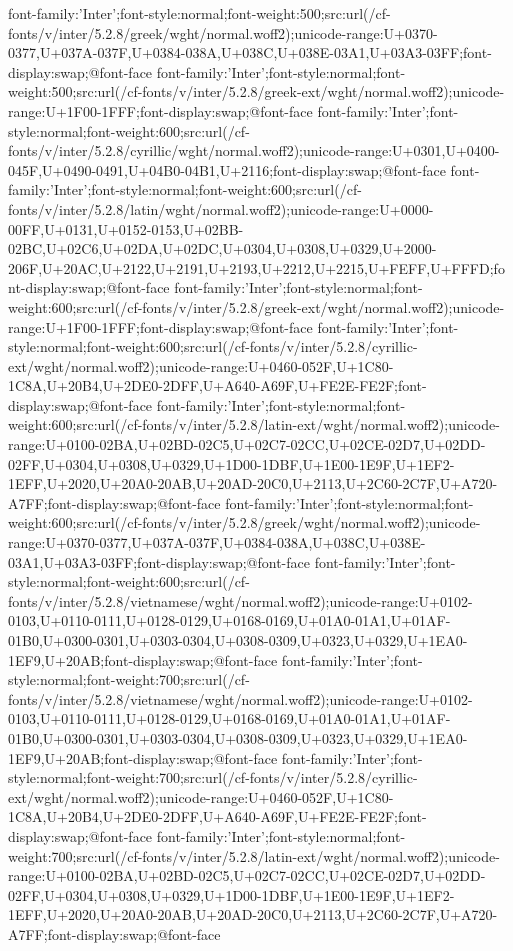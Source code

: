 {font-family:'Inter';font-style:normal;font-weight:500;src:url(/cf-fonts/v/inter/5.2.8/greek/wght/normal.woff2);unicode-range:U+0370-0377,U+037A-037F,U+0384-038A,U+038C,U+038E-03A1,U+03A3-03FF;font-display:swap;}@font-face {font-family:'Inter';font-style:normal;font-weight:500;src:url(/cf-fonts/v/inter/5.2.8/greek-ext/wght/normal.woff2);unicode-range:U+1F00-1FFF;font-display:swap;}@font-face {font-family:'Inter';font-style:normal;font-weight:600;src:url(/cf-fonts/v/inter/5.2.8/cyrillic/wght/normal.woff2);unicode-range:U+0301,U+0400-045F,U+0490-0491,U+04B0-04B1,U+2116;font-display:swap;}@font-face {font-family:'Inter';font-style:normal;font-weight:600;src:url(/cf-fonts/v/inter/5.2.8/latin/wght/normal.woff2);unicode-range:U+0000-00FF,U+0131,U+0152-0153,U+02BB-02BC,U+02C6,U+02DA,U+02DC,U+0304,U+0308,U+0329,U+2000-206F,U+20AC,U+2122,U+2191,U+2193,U+2212,U+2215,U+FEFF,U+FFFD;font-display:swap;}@font-face {font-family:'Inter';font-style:normal;font-weight:600;src:url(/cf-fonts/v/inter/5.2.8/greek-ext/wght/normal.woff2);unicode-range:U+1F00-1FFF;font-display:swap;}@font-face {font-family:'Inter';font-style:normal;font-weight:600;src:url(/cf-fonts/v/inter/5.2.8/cyrillic-ext/wght/normal.woff2);unicode-range:U+0460-052F,U+1C80-1C8A,U+20B4,U+2DE0-2DFF,U+A640-A69F,U+FE2E-FE2F;font-display:swap;}@font-face {font-family:'Inter';font-style:normal;font-weight:600;src:url(/cf-fonts/v/inter/5.2.8/latin-ext/wght/normal.woff2);unicode-range:U+0100-02BA,U+02BD-02C5,U+02C7-02CC,U+02CE-02D7,U+02DD-02FF,U+0304,U+0308,U+0329,U+1D00-1DBF,U+1E00-1E9F,U+1EF2-1EFF,U+2020,U+20A0-20AB,U+20AD-20C0,U+2113,U+2C60-2C7F,U+A720-A7FF;font-display:swap;}@font-face {font-family:'Inter';font-style:normal;font-weight:600;src:url(/cf-fonts/v/inter/5.2.8/greek/wght/normal.woff2);unicode-range:U+0370-0377,U+037A-037F,U+0384-038A,U+038C,U+038E-03A1,U+03A3-03FF;font-display:swap;}@font-face {font-family:'Inter';font-style:normal;font-weight:600;src:url(/cf-fonts/v/inter/5.2.8/vietnamese/wght/normal.woff2);unicode-range:U+0102-0103,U+0110-0111,U+0128-0129,U+0168-0169,U+01A0-01A1,U+01AF-01B0,U+0300-0301,U+0303-0304,U+0308-0309,U+0323,U+0329,U+1EA0-1EF9,U+20AB;font-display:swap;}@font-face {font-family:'Inter';font-style:normal;font-weight:700;src:url(/cf-fonts/v/inter/5.2.8/vietnamese/wght/normal.woff2);unicode-range:U+0102-0103,U+0110-0111,U+0128-0129,U+0168-0169,U+01A0-01A1,U+01AF-01B0,U+0300-0301,U+0303-0304,U+0308-0309,U+0323,U+0329,U+1EA0-1EF9,U+20AB;font-display:swap;}@font-face {font-family:'Inter';font-style:normal;font-weight:700;src:url(/cf-fonts/v/inter/5.2.8/cyrillic-ext/wght/normal.woff2);unicode-range:U+0460-052F,U+1C80-1C8A,U+20B4,U+2DE0-2DFF,U+A640-A69F,U+FE2E-FE2F;font-display:swap;}@font-face {font-family:'Inter';font-style:normal;font-weight:700;src:url(/cf-fonts/v/inter/5.2.8/latin-ext/wght/normal.woff2);unicode-range:U+0100-02BA,U+02BD-02C5,U+02C7-02CC,U+02CE-02D7,U+02DD-02FF,U+0304,U+0308,U+0329,U+1D00-1DBF,U+1E00-1E9F,U+1EF2-1EFF,U+2020,U+20A0-20AB,U+20AD-20C0,U+2113,U+2C60-2C7F,U+A720-A7FF;font-display:swap;}@font-face 
